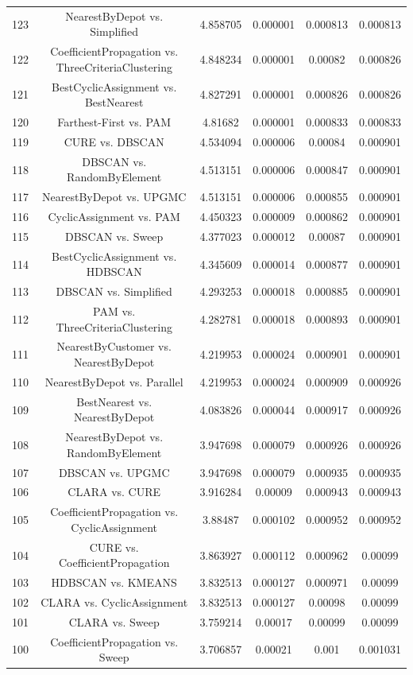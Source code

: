 \documentclass[a4paper,10pt]{article}
\begin{document}
\begin{landscape}
\begin{table}[!htp]
\begin{tabular}{cccccc}
123&NearestByDepot vs. Simplified&4.858705&0.000001&0.000813&0.000813\\
122&CoefficientPropagation vs. ThreeCriteriaClustering&4.848234&0.000001&0.00082&0.000826\\
121&BestCyclicAssignment vs. BestNearest&4.827291&0.000001&0.000826&0.000826\\
120&Farthest-First vs. PAM&4.81682&0.000001&0.000833&0.000833\\
119&CURE vs. DBSCAN&4.534094&0.000006&0.00084&0.000901\\
118&DBSCAN vs. RandomByElement&4.513151&0.000006&0.000847&0.000901\\
117&NearestByDepot vs. UPGMC&4.513151&0.000006&0.000855&0.000901\\
116&CyclicAssignment vs. PAM&4.450323&0.000009&0.000862&0.000901\\
115&DBSCAN vs. Sweep&4.377023&0.000012&0.00087&0.000901\\
114&BestCyclicAssignment vs. HDBSCAN&4.345609&0.000014&0.000877&0.000901\\
113&DBSCAN vs. Simplified&4.293253&0.000018&0.000885&0.000901\\
112&PAM vs. ThreeCriteriaClustering&4.282781&0.000018&0.000893&0.000901\\
111&NearestByCustomer vs. NearestByDepot&4.219953&0.000024&0.000901&0.000901\\
110&NearestByDepot vs. Parallel&4.219953&0.000024&0.000909&0.000926\\
109&BestNearest vs. NearestByDepot&4.083826&0.000044&0.000917&0.000926\\
108&NearestByDepot vs. RandomByElement&3.947698&0.000079&0.000926&0.000926\\
107&DBSCAN vs. UPGMC&3.947698&0.000079&0.000935&0.000935\\
106&CLARA vs. CURE&3.916284&0.00009&0.000943&0.000943\\
105&CoefficientPropagation vs. CyclicAssignment&3.88487&0.000102&0.000952&0.000952\\
104&CURE vs. CoefficientPropagation&3.863927&0.000112&0.000962&0.00099\\
103&HDBSCAN vs. KMEANS&3.832513&0.000127&0.000971&0.00099\\
102&CLARA vs. CyclicAssignment&3.832513&0.000127&0.00098&0.00099\\
101&CLARA vs. Sweep&3.759214&0.00017&0.00099&0.00099\\
100&CoefficientPropagation vs. Sweep&3.706857&0.00021&0.001&0.001031\\

\end{tabular}
\end{table}
\end{landscape}
\end{document}
